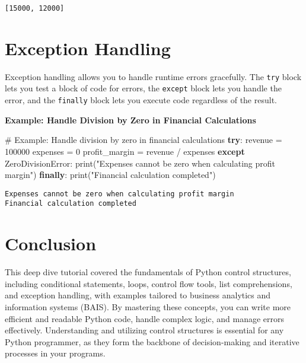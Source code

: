 \documentclass[
  letterpaper,
  DIV=11,
  numbers=noendperiod]{scrreprt}
\newenvironment{Shaded}{\begin{snugshade}}{\end{snugshade}}
\newcommand{\BuiltInTok}[1]{\textcolor[rgb]{0.00,0.23,0.31}{#1}}
\newcommand{\CommentTok}[1]{\textcolor[rgb]{0.37,0.37,0.37}{#1}}
\newcommand{\ControlFlowTok}[1]{\textcolor[rgb]{0.00,0.23,0.31}{\textbf{#1}}}
\newcommand{\DecValTok}[1]{\textcolor[rgb]{0.68,0.00,0.00}{#1}}
\newcommand{\NormalTok}[1]{\textcolor[rgb]{0.00,0.23,0.31}{#1}}
\newcommand{\OperatorTok}[1]{\textcolor[rgb]{0.37,0.37,0.37}{#1}}
\newcommand{\PreprocessorTok}[1]{\textcolor[rgb]{0.68,0.00,0.00}{#1}}
\newcommand{\StringTok}[1]{\textcolor[rgb]{0.13,0.47,0.30}{#1}}
\begin{document}
\begin{verbatim}
[15000, 12000]
\end{verbatim}

\section{Exception Handling}\label{exception-handling-1}

Exception handling allows you to handle runtime errors gracefully. The
\texttt{try} block lets you test a block of code for errors, the
\texttt{except} block lets you handle the error, and the
\texttt{finally} block lets you execute code regardless of the result.

\textbf{Example: Handle Division by Zero in Financial Calculations}

\begin{Shaded}
\begin{Highlighting}[]
\CommentTok{\# Example: Handle division by zero in financial calculations}
\ControlFlowTok{try}\NormalTok{:}
\NormalTok{    revenue }\OperatorTok{=} \DecValTok{100000}
\NormalTok{    expenses }\OperatorTok{=} \DecValTok{0}
\NormalTok{    profit\_margin }\OperatorTok{=}\NormalTok{ revenue }\OperatorTok{/}\NormalTok{ expenses}
\ControlFlowTok{except} \PreprocessorTok{ZeroDivisionError}\NormalTok{:}
    \BuiltInTok{print}\NormalTok{(}\StringTok{"Expenses cannot be zero when calculating profit margin"}\NormalTok{)}
\ControlFlowTok{finally}\NormalTok{:}
    \BuiltInTok{print}\NormalTok{(}\StringTok{"Financial calculation completed"}\NormalTok{)}
\end{Highlighting}
\end{Shaded}

\begin{verbatim}
Expenses cannot be zero when calculating profit margin
Financial calculation completed
\end{verbatim}

\section{Conclusion}\label{conclusion-3}

This deep dive tutorial covered the fundamentals of Python control
structures, including conditional statements, loops, control flow tools,
list comprehensions, and exception handling, with examples tailored to
business analytics and information systems (BAIS). By mastering these
concepts, you can write more efficient and readable Python code, handle
complex logic, and manage errors effectively. Understanding and
utilizing control structures is essential for any Python programmer, as
they form the backbone of decision-making and iterative processes in
your programs.
\end{document}
